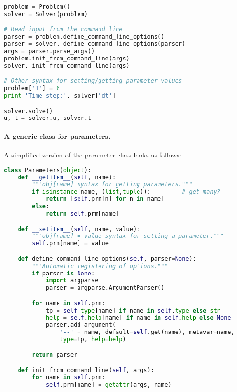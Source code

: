 \documentclass[graybox,sectrefs,envcountresetchap,open=right,final]{svmonodo}
\begin{document}
\begin{lstlisting}[language=python,style=blue1_bluegreen]
problem = Problem()
solver = Solver(problem)

# Read input from the command line
parser = problem.define_command_line_options()
parser = solver. define_command_line_options(parser)
args = parser.parse_args()
problem.init_from_command_line(args)
solver. init_from_command_line(args)

# Other syntax for setting/getting parameter values
problem['T'] = 6
print 'Time step:', solver['dt']

solver.solve()
u, t = solver.u, solver.t

\end{lstlisting}


\paragraph{A generic class for parameters.}
A simplified version of the parameter class looks as follows:
































\begin{lstlisting}[language=python,style=blue1_bluegreen]
class Parameters(object):
    def __getitem__(self, name):
        """obj[name] syntax for getting parameters."""
        if isinstance(name, (list,tuple)):         # get many?
            return [self.prm[n] for n in name]
        else:
            return self.prm[name]

    def __setitem__(self, name, value):
        """obj[name] = value syntax for setting a parameter."""
        self.prm[name] = value

    def define_command_line_options(self, parser=None):
        """Automatic registering of options."""
        if parser is None:
            import argparse
            parser = argparse.ArgumentParser()

        for name in self.prm:
            tp = self.type[name] if name in self.type else str
            help = self.help[name] if name in self.help else None
            parser.add_argument(
                '--' + name, default=self.get(name), metavar=name,
                type=tp, help=help)

        return parser

    def init_from_command_line(self, args):
        for name in self.prm:
            self.prm[name] = getattr(args, name)

\end{lstlisting}
\end{document}
